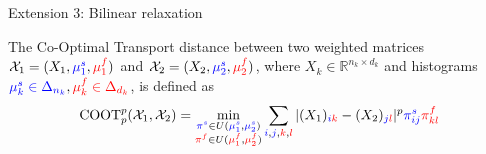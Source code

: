 \documentclass{beamer}
\newcommand{\coot}{\text{COOT}}
\newcommand{\cX}{\mathcal X}
\newcommand{\bbR}{\mathbb R}
\newcommand{\pis}{{\color{blue}{\pi^s}}}
\newcommand{\pif}{{\color{red}{\pi^f}}}
\newcommand{\mfsrc}{{\color{red}{\mu_1^f}}}
\newcommand{\mftg}{{\color{red}{\mu_2^f}}}
\newcommand{\mssrc}{{\color{blue}{\mu_1^s}}}
\newcommand{\mstg}{{\color{blue}{\mu_2^s}}}
\begin{document}
\begin{frame}{Extension 3: Bilinear relaxation}
\scriptsize

\begin{definition}
  The Co-Optimal Transport distance between
  two weighted matrices $\cX_1 = (X_1, \mssrc, \mfsrc)$
and $\cX_2 = (X_2, \mstg, \mftg)$, where
$X_k \in \bbR^{n_k \times d_k}$ and histograms
${\color{blue}{\mu^s_k \in \Delta_{n_k}}}, {\color{red}{\mu^f_k \in \Delta_{d_k}}}$,
is defined as
\begin{align*}
  \coot_p^p(\cX_1, \cX_2) =
  \min_{\substack{\pis \in U(\mssrc,\mstg) \\ \pif \in U(\mfsrc,\mftg)}}
  \sum_{{\color{blue}{i}},{\color{blue}{j}},{\color{red}{k}},{\color{red}{l}}}
  |(X_1)_{{\color{blue}{i}} {\color{red}{k}}} - (X_2)_{{\color{blue}{j}}{\color{red}{l}}}|^p {\color{blue}{\pi^s_{ij}}} {\color{red}{\pi^f_{kl}}}
\end{align*}
\end{definition}



\end{frame}
\end{document}
